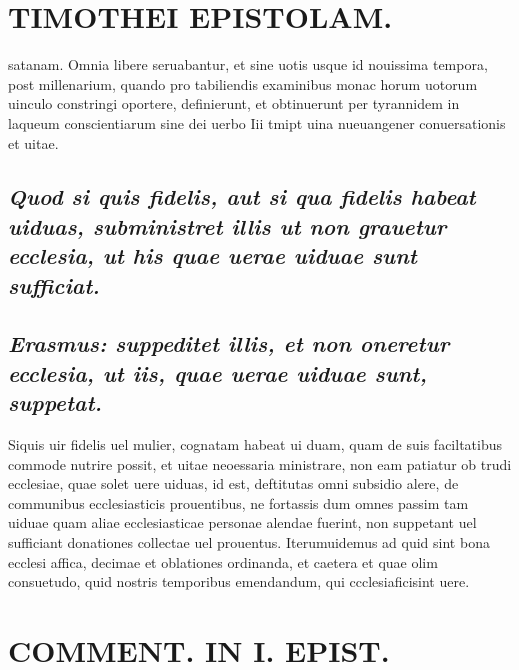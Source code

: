\documentclass{article}
\begin{document}
\begin{pages}
\section*{TIMOTHEI EPISTOLAM. }
\marginpar{[ p.135 ]}\pstart satanam. Omnia libere seruabantur, et sine uotis usque  id nouissima tempora, post millenarium, quando pro tabiliendis examinibus monac horum uotorum uinculo constringi oportere, definierunt, et obtinuerunt per tyrannidem in laqueum conscientiarum sine dei uerbo Iii tmipt uina nueuangener conuersationis et uitae.  \pend
{}
{}
\subsection*{\textit{Quod si quis fidelis, aut si qua fidelis habeat uiduas, subministret illis ut non grauetur ecclesia, ut his quae uerae uiduae sunt sufficiat. }}
{}
\subsection*{\textit{Erasmus: suppeditet illis, et non oneretur ecclesia, ut iis, quae uerae uiduae sunt, suppetat. }}\pstart Siquis uir fidelis uel mulier, cognatam habeat ui duam, quam de suis faciltatibus commode nutrire possit, et uitae neoessaria ministrare, non eam patiatur ob trudi ecclesiae, quae solet uere uiduas, id est, deftitutas omni subsidio alere, de communibus ecclesiasticis prouentibus, ne fortassis dum omnes passim tam uiduae quam aliae ecclesiasticae personae alendae fuerint, non suppetant uel sufficiant donationes collectae uel prouentus. Iterumuidemus ad quid sint bona ecclesi affica, decimae et oblationes ordinanda, et caetera et quae olim consuetudo, quid nostris temporibus emendandum, qui ccclesiaficisint uere.  \pend
\section*{COMMENT. IN I. EPIST. }
\marginpar{[ p.136 ]}
{}

\end{pages}
\end{document}
